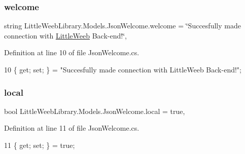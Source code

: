 \subsubsection{\texorpdfstring{welcome}{welcome}}
{\footnotesize\ttfamily string Little\+Weeb\+Library.\+Models.\+Json\+Welcome.\+welcome = \char`\"{}Succesfully made connection with \mbox{\hyperlink{class_little_weeb_library_1_1_little_weeb}{Little\+Weeb}} Back-\/end!\char`\"{}\hspace{0.3cm}{\ttfamily [get]}, {\ttfamily [set]}}



Definition at line 10 of file Json\+Welcome.\+cs.


\begin{DoxyCode}
10 \{ \textcolor{keyword}{get}; \textcolor{keyword}{set}; \} = \textcolor{stringliteral}{"Succesfully made connection with LittleWeeb Back-end!"};
\end{DoxyCode}
\mbox{\label{class_little_weeb_library_1_1_models_1_1_json_welcome_ad8a5e8ff3eb2ced1a8fea61ce161aff6}} 
\subsubsection{\texorpdfstring{local}{local}}
{\footnotesize\ttfamily bool Little\+Weeb\+Library.\+Models.\+Json\+Welcome.\+local = true\hspace{0.3cm}{\ttfamily [get]}, {\ttfamily [set]}}



Definition at line 11 of file Json\+Welcome.\+cs.


\begin{DoxyCode}
11 \{ \textcolor{keyword}{get}; \textcolor{keyword}{set}; \} = \textcolor{keyword}{true};
\end{DoxyCode}
\mbox{\label{class_little_weeb_library_1_1_models_1_1_json_welcome_ad3fc6cf68f64e870ffd7cfabf1930e87}} 
